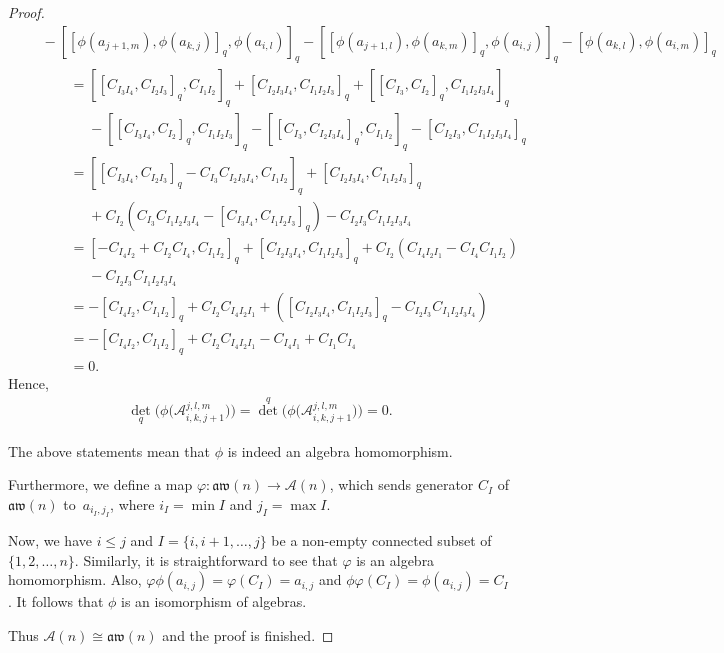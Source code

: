 \documentclass[pdftex]{sigma}
\numberwithin{equation}{section}
\def\lrb#1{\left(#1\right)}
\def\A{\mathscr{A}}
\def\aw{\mathfrak{aw}}
\begin{document}
\begin{proof}
\begin{gather*}
 \qquad {}- [ [ \phi(a_{j+1, m}), \phi(a_{k, j}) ]_q, \phi(a_{i, l}) ]_q - [ [\phi(a_{j+1, l}), \phi(a_{k, m}) ]_q, \phi(a_{i, j}) ]_q- [\phi(a_{k, l}), \phi(a_{i, m}) ]_q\\
 \phantom{\qquad\qquad}{} = [ [C_{I_3I_4}, C_{I_2I_3} ]_q, C_{I_1I_2} ]_q+ [C_{I_2I_3I_4}, C_{I_1I_2I_3} ]_q + [ [C_{I_3}, C_{I_2} ]_q, C_{I_1I_2I_3I_4} ]_q \\
 \phantom{\qquad\qquad=}{} - [ [ C_{I_3I_4}, C_{I_2} ]_q, C_{I_1I_2I_3} ]_q - [ [C_{I_3}, C_{I_2I_3I_4} ]_q, C_{I_1I_2} ]_q- [C_{I_2I_3}, C_{I_1I_2I_3I_4} ]_q\\
 \phantom{\qquad\qquad}{} = [ [C_{I_3I_4}, C_{I_2I_3} ]_q-C_{I_3} C_{I_2I_3I_4}, C_{I_1I_2} ]_q+ [C_{I_2I_3I_4}, C_{I_1I_2I_3} ]_q \\
 \phantom{\qquad\qquad=}{} +C_{I_2}\lrb{C_{I_3}C_{I_1I_2I_3I_4}- [ C_{I_3I_4}, C_{I_1I_2I_3} ]_q }-C_{I_2I_3} C_{I_1I_2I_3I_4}\\
 \phantom{\qquad\qquad}{} = [-C_{I_4I_2}+C_{I_2} C_{I_4}, C_{I_1I_2} ]_q+ [C_{I_2I_3I_4}, C_{I_1I_2I_3} ]_q +C_{I_2}\lrb{C_{I_4I_2I_1}-C_{I_4}C_{I_1I_2}}\\
 \phantom{\qquad\qquad=}{} -C_{I_2I_3} C_{I_1I_2I_3I_4}\\
 \phantom{\qquad\qquad}{} = - [C_{I_4I_2}, C_{I_1I_2} ]_q +C_{I_2}C_{I_4I_2I_1}+ \lrb{ [C_{I_2I_3I_4}, C_{I_1I_2I_3} ]_q -C_{I_2I_3} C_{I_1I_2I_3I_4}}\\
 \phantom{\qquad\qquad}{} = - [C_{I_4I_2}, C_{I_1I_2} ]_q +C_{I_2}C_{I_4I_2I_1}- C_{I_4I_1}+C_{I_1}C_{I_4}\\
 \phantom{\qquad\qquad}{} = 0.
 \end{gather*}
Hence,
\begin{gather*}
{\det}_q\bigl(\phi\bigl(\A_{i,k,j+1}^{j,l,m}\bigr)\bigr)={\det}^q\bigl(\phi\bigl(\A_{i,k,j+1}^{j,l,m}\bigr)\bigr)=0.
\end{gather*}

The above statements mean that $\phi$ is indeed an algebra homomorphism.

Furthermore, we define a map $\varphi\colon \aw(n) \rightarrow \A(n)$, which sends generator $C_I$ of $\aw(n)$ to~$a_{i_I, j_I}$, where $i_I=\min I$ and $j_I=\max I$.

Now, we have $i \leq j$ and $I=\{i, i+1, \dots, j\}$ be a non-empty connected subset of $\{1, 2, \dots, n\}$.
Similarly, it is straightforward to see that $\varphi$ is an algebra homomorphism.
Also, $\varphi \phi\lrb{a_{i, j}}=\varphi\lrb{C_I}=a_{i, j}$ and $\phi \varphi \lrb{C_I}=\phi\lrb{a_{i, j}}=C_I$.
It follows that $\phi$ is an isomorphism of algebras.

Thus $\A(n) \cong \aw(n)$
and the proof is finished.
\end{proof}
\end{document}
